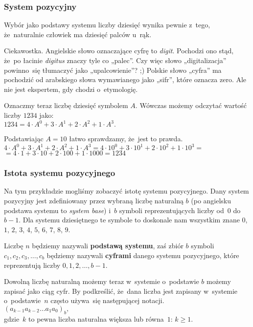 \documentclass[10pt,t]{beamer}
\begin{document}
\begin{frame}
  \frametitle{System pozycyjny}


  Wybór jako podstawy systemu liczby dziesięć wynika pewnie z~tego,
  że~naturalnie człowiek ma dziesięć palców u~rąk.

  \alert{Ciekawostka.} Angielskie słowo oznaczające cyfrę to \textit{digit}.
  Pochodzi ono stąd, że~po łacinie \textit{digitus} znaczy tyle co „palec”.
  Czy więc słowo „digitalizacja” powinno~się tłumaczyć jako „upalcowienie”?
  ;) Polskie słowo „cyfra” ma pochodzić od arabskiego słowa wymawianego jako
  „sifr”, które oznacza zero. Ale nie jest ekspertem, gdy chodzi
  o~etymologię.

  Oznaczmy teraz liczbę dziesięć symbolem $A$. Wówczas możemy odczytać
  wartość liczby $1234$ jako: \\
  $\displaystyle
  1234 = 4 \cdot A^{ 0 } + 3 \cdot A^{ 1 } + 2 \cdot A^{ 2 } + 1 \cdot A^{ 3 }.$

  Podstawiając $A = 10$ łatwo sprawdzamy, że~jest to prawda. \\
  $\displaystyle
  4 \cdot A^{ 0 } + 3 \cdot A^{ 1 } + 2 \cdot A^{ 2 } + 1 \cdot A^{ 3 } =
  4 \cdot 10^{ 0 } + 3 \cdot 10^{ 1 } + 2 \cdot 10^{ 2 } + 1 \cdot 10^{ 3 } =$ \\
  $\displaystyle
  = 4 \cdot 1 + 3 \cdot 10 + 2 \cdot 100 + 1 \cdot 1 000 = 1234$

\end{frame}





\begin{frame}
  \frametitle{Istota systemu pozycyjnego}


  Na tym przykładzie mogliśmy zobaczyć istotę systemu pozycyjnego. Dany
  system pozycyjny jest zdefiniowany przez wybraną liczbę naturalną $b$
  (po angielsku podstawa systemu to \textit{system base}) i~$b$ symboli
  reprezentujących liczby od~$0$ do~$b - 1$. Dla systemu dziesiętnego te
  symbole to doskonale nam wszystkim znane $0$, $1$, $2$, $3$, $4$, $5$,
  $6$, $7$, $8$, $9$.

  Liczbę $n$ będziemy nazywali \textbf{podstawą systemu}, zaś zbiór $b$
  symboli $c_{ 1 }, c_{ 2 }, c_{ 3 }, \ldots, c_{ b }$ będziemy nazywali
  \textbf{cyframi}
  danego systemu pozycyjnego, które reprezentują liczby $0, 1, 2, \ldots, b - 1$.

  Dowolną liczbę naturalną możemy teraz w~systemie o~podstawie $b$ możemy
  zapisać jako ciąg cyfr. By podkreślić, że~dana liczba jest zapisany
  w~systemie o~podstawie~$n$ często używa~się następującej notacji. \\
  $\displaystyle
  ( a_{ k - 1 } a_{ k - 2 } \ldots a_{ 1 } a_{ 0 } )_{ b },$ \\
  gdzie~$k$ to pewna liczba naturalna większa lub równa~$1$: $k \geq 1$.

\end{frame}
\end{document}
